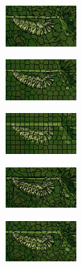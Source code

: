 \begin{figure}
	\centering
	\begin{subfigure}[b]{0.02\textwidth}
	\end{subfigure}
	\begin{subfigure}[b]{0.141\textwidth}
		\includegraphics[height=1.525cm]{pictures/compactness/bsds500/slic/score/1/cropped/slic_35028_contours}
	\end{subfigure}
	\begin{subfigure}[b]{0.141\textwidth}
		\includegraphics[height=1.525cm]{pictures/compactness/bsds500/slic/score/10/cropped/slic_35028_contours}
	\end{subfigure}
	\begin{subfigure}[b]{0.141\textwidth}
		\includegraphics[height=1.525cm]{pictures/compactness/bsds500/slic/score/80/cropped/slic_35028_contours}
	\end{subfigure}
	\begin{subfigure}[b]{0.02\textwidth}
	\end{subfigure}
	\begin{subfigure}[b]{0.141\textwidth}
		\includegraphics[height=1.525cm]{pictures/compactness/bsds500/crs/score/0.001/cropped/crs_35028_contours}
	\end{subfigure}
	\begin{subfigure}[b]{0.141\textwidth}
		\includegraphics[height=1.525cm]{pictures/compactness/bsds500/crs/score/0.01/cropped/crs_35028_contours}

\end{subfigure}
\end{figure}
